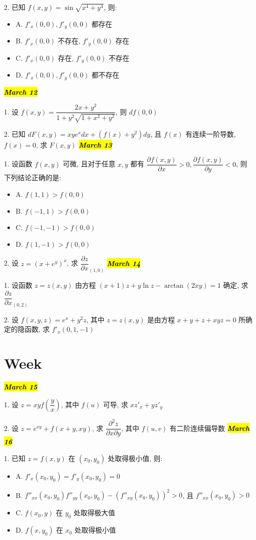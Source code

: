 2. 已知 $f(x,y)=\sin\sqrt{x^{4}+y^{4}}$, 则:
\begin{itemize}
	\item A. $f'_{x}(0,0),f'_{y}(0,0)$ 都存在
	\item B. $f'_{x}(0,0)$ 不存在, $f'_{y}(0,0)$ 存在
	\item C. $f'_{x}(0,0)$ 存在, $f'_{y}(0,0)$ 不存在
	\item D. $f'_{x}(0,0),f'_{y}(0,0)$ 都不存在
\end{itemize}
\hl{\textbf{\textit{March 12}}}

1. 设 $f(x,y)=\dfrac{2x+y^{2}}{1+y^{2}\sqrt{1+x^{2}+y^{2}}}$, 则 $d f(0,0)$

2. 已知 $dF(x,y)=xye^{x}dx+(f(x)+y^{2})dy$, 且 $f(x)$ 有连续一阶导数, $f(x)=0$, 求 $F(x,y)$
\hl{\textbf{\textit{March 13}}}

1. 设函数 $f(x,y)$ 可微, 且对于任意 $x,y$ 都有 $\dfrac{\partial f(x,y)}{\partial x}>0,\dfrac{\partial f(x,y)}{\partial y}<0$, 则下列结论正确的是:
\begin{itemize}
	\item A. $f(1,1)>f(0,0)$
	\item B. $f(-1,1)>f(0,0)$
	\item C. $f(-1,-1)>f(0,0)$
	\item D. $f(1,-1)>f(0,0)$
\end{itemize}

2. 设 $z=(x+e^{y})^{x}$, 求 $\dfrac{\partial z}{\partial x}_{(1,0)}$
\hl{\textbf{\textit{March 14}}}

1. 设函数 $z=z(x,y)$ 由方程 $(x+1)z+y\ln z-\arctan(2xy)=1$ 确定, 求$\dfrac{\partial z}{\partial x}_{(0,2)}$

2. 设 $f(x,y,z)=e^{x}+y^{2}z$, 其中 $z=z(x,y)$ 是由方程 $x+y+z+xyz=0$ 所确定的隐函数, 求 $f'_{x}(0,1,-1)$
\section{Week }
\hl{\textbf{\textit{March 15}}}

1. 设 $z=xyf(\dfrac{y}{x})$, 其中 $f(u)$ 可导, 求 $xz'_{x}+yz'_{y}$

2. 设 $z=e^{xy}+f(x+y,xy)$, 求 $\dfrac{\partial^{2} z}{\partial x\partial y}$, 其中 $f(u,v)$ 有二阶连续偏导数
\hl{\textbf{\textit{March 16}}}

1. 已知 $z=f(x,y)$ 在 $(x_{0},y_{0})$ 处取得极小值, 则:
\begin{itemize}
	\item A. $f'_{x}(x_{0},y_{0})=f'_{y}(x_{0},y_{0})=0$
	\item B. $f''_{xx}(x_{0},y_{0})f''_{yy}(x_{0},y_{0})-(f''_{xy}(x_{0},y_{0}))^{2}>0$, 且 $f''_{xx}(x_{0},y_{0})>0$
	\item C. $f(x_{0},y)$ 在 $y_{0}$ 处取得极大值
	\item D. $f(x,y_{0})$ 在 $x_{0}$ 处取得极小值
\end{itemize}

